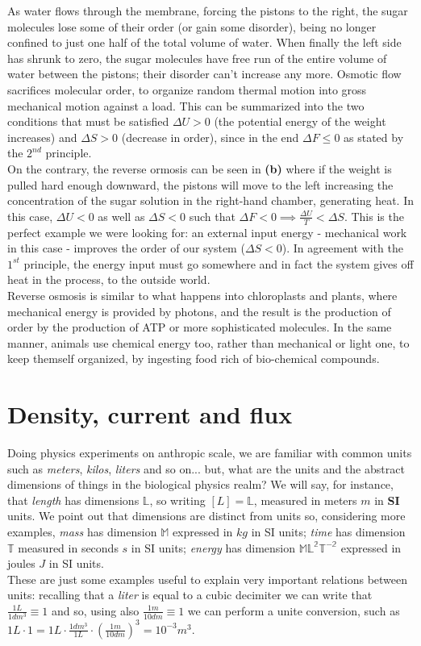 \documentclass[../main/main.tex]{subfiles}
\begin{document}
As water flows through the membrane, forcing the pistons to the right, the sugar molecules lose some of their order (or gain some disorder), being no longer confined to just one half of the total volume of water. When finally the left side has shrunk to zero, the sugar molecules have free run of the entire volume of water between the pistons; their disorder can't increase any more. Osmotic flow sacrifices molecular
order, to organize random thermal motion into gross mechanical motion against a load. This can be summarized into the two conditions that must be satisfied $\Delta U>0 $ (the potential energy of the weight increases) and $\Delta S>0$ (decrease in order), since in the end $\Delta F \leq 0$ as stated by the $2^{nd}$ principle. \\
On the contrary, the reverse ormosis can be seen in \textbf{(b)} where if the weight is pulled hard enough downward, the pistons will move to the left increasing the concentration of the sugar solution in the right-hand chamber, generating heat. In this case, $\Delta U<0$ as well as $\Delta S<0$ such that $\Delta F <0\implies \frac{\Delta U}{T} < \Delta S$. This is the perfect example we were looking for: an external input energy - mechanical work in this case - improves the order of our system ($\Delta S <0$). 
In agreement with the $1^{st}$ principle, the energy input must go somewhere and in fact the system gives off heat in the process, to the outside world.\\
Reverse osmosis is similar to what happens into chloroplasts and plants, where mechanical energy is provided by photons, and the result is the production of order by the production of ATP or more sophisticated molecules. In the same manner, animals use chemical energy too, rather than mechanical or light one, to keep themself organized, by ingesting food rich of bio-chemical compounds.


\section{Density, current and flux}
Doing physics experiments on anthropic scale, we are familiar with common units such as \emph{meters}, \emph{kilos}, \emph{liters} and so on... but, what are the units and the abstract dimensions of things in the biological physics realm? 
We will say, for instance, that \emph{length} has dimensions $\mathbb{L}$, so writing $[L] = \mathbb{L}$, measured in meters $m$ in \textbf{SI} units. We point out that dimensions are distinct from units so, considering more examples, \emph{mass} has dimension $\mathbb{M}$ expressed in $kg$ in SI units; \emph{time} has dimension $\mathbb{T}$ measured in seconds $s$ in SI units; \emph{energy} has dimension $\mathbb{ML^2T^{-2}}$ expressed in joules $J$ in SI units. \\ 
These are just some examples useful to explain very important relations between units: recalling that a \emph{liter} is equal to a cubic decimiter we can write that $\frac{1L}{1dm^3}\equiv1$ and so, using also $\frac{1m}{10dm}\equiv1$ we can perform a unite conversion, such as $1L\cdot 1 = 1L\cdot\frac{1dm^3}{1L}\cdot(\frac{1m}{10dm})^3 = 10^{-3}m^3$.
\end{document}
